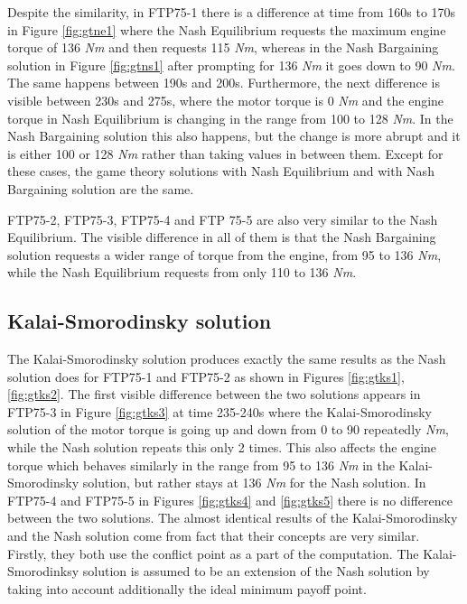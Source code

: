 Despite the similarity, in FTP75-1 there is a difference at time from 160s to 170s in Figure \ref{fig:gtne1} where the Nash Equilibrium requests the maximum engine torque of 136 \textit{Nm} and then requests 115 \textit{Nm}, whereas in the Nash Bargaining solution in Figure \ref{fig:gtns1} after prompting for 136 \textit{Nm} it goes down to 90 \textit{Nm}. The same happens between 190s and 200s. Furthermore, the next difference is visible between 230s and 275s, where the motor torque is 0 \textit{Nm} and the engine torque in Nash Equilibrium is changing in the range from 100 to 128 \textit{Nm}. In the Nash Bargaining solution this also happens, but the change is more abrupt and it is either 100 or 128 \textit{Nm} rather than taking values in between them. Except for these cases, the game theory solutions with Nash Equilibrium and with Nash Bargaining solution are the same.

FTP75-2, FTP75-3, FTP75-4 and FTP 75-5 are also very similar to the Nash Equilibrium. The visible difference in all of them is that the Nash Bargaining solution requests a wider range of torque from the engine, from 95 to 136 \textit{Nm}, while the Nash Equilibrium requests from only 110 to 136 \textit{Nm}.

\subsection{Kalai-Smorodinsky solution}
The Kalai-Smorodinsky solution produces exactly the same results as the Nash solution does for FTP75-1 and FTP75-2 as shown in Figures \ref{fig:gtks1}, \ref{fig:gtks2}. The first visible difference between the two solutions appears in FTP75-3 in Figure \ref{fig:gtks3} at time 235-240s where the Kalai-Smorodinsky solution of the motor torque is going up and down from 0 to 90 repeatedly \textit{Nm}, while the Nash solution repeats this only 2 times. This also affects the engine torque which behaves similarly in the range from 95 to 136 \textit{Nm} in the Kalai-Smorodinsky solution, but rather stays at 136 \textit{Nm} for the Nash solution. In FTP75-4 and FTP75-5 in Figures \ref{fig:gtks4} and \ref{fig:gtks5} there is no difference between the two solutions. The almost identical results of the Kalai-Smorodinsky and the Nash solution come from fact that their concepts are very similar. Firstly, they both use the conflict point as a part of the computation. The Kalai-Smorodinksy solution is assumed to be an extension of the Nash solution by taking into account additionally the ideal minimum payoff point.

